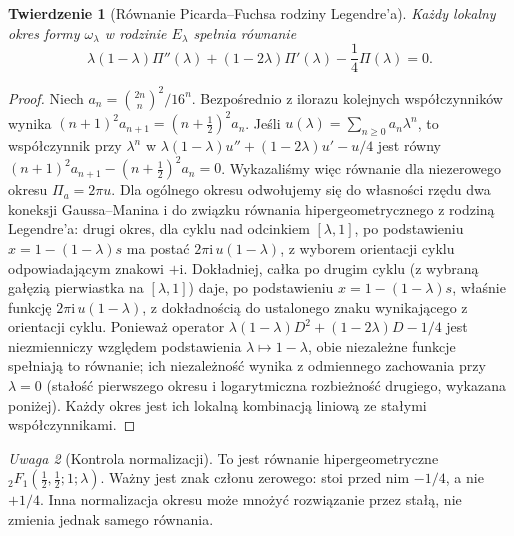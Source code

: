\documentclass[11pt,a4paper,oneside]{report}
\theoremstyle{plain}
\newtheorem{twierdzenie}{Twierdzenie}[section]
\theoremstyle{definition}
\theoremstyle{remark}
\newtheorem{uwaga}[twierdzenie]{Uwaga}
\begin{document}
\begin{twierdzenie}[Równanie Picarda--Fuchsa rodziny Legendre'a]
\label{thm:xv-legendre-pf}
Każdy lokalny okres formy $\omega_\lambda$ w rodzinie
$E_\lambda$ spełnia równanie
\[
\lambda(1-\lambda)\Pi''(\lambda)
+(1-2\lambda)\Pi'(\lambda)
-\frac14\Pi(\lambda)=0.
\]
\end{twierdzenie}
\begin{proof}
Niech $a_n=\binom{2n}{n}^2/16^n$.
Bezpośrednio z ilorazu kolejnych współczynników wynika
$(n+1)^2a_{n+1}=(n+\frac12)^2a_n$.
Jeśli $u(\lambda)=\sum_{n\ge0}a_n\lambda^n$,
to współczynnik przy $\lambda^n$ w
$\lambda(1-\lambda)u''+(1-2\lambda)u'-u/4$
jest równy
$(n+1)^2a_{n+1}-(n+\frac12)^2a_n=0$.
Wykazaliśmy więc równanie dla niezerowego okresu
$\Pi_a=2\pi u$. Dla ogólnego okresu odwołujemy się
do własności rzędu dwa koneksji Gaussa--Manina i
do związku równania hipergeometrycznego z rodziną
Legendre'a: drugi okres, dla cyklu nad odcinkiem $[\lambda,1]$,
po podstawieniu $x=1-(1-\lambda)s$ ma postać
$2\pi\mathrm i\,u(1-\lambda)$, z wyborem orientacji cyklu
odpowiadającym znakowi $+\mathrm i$.
Dokładniej, całka po drugim cyklu (z wybraną gałęzią
pierwiastka na $[\lambda,1]$) daje, po podstawieniu
$x=1-(1-\lambda)s$, właśnie funkcję
$2\pi\mathrm i\,u(1-\lambda)$, z dokładnością do
ustalonego znaku wynikającego z orientacji cyklu.
Ponieważ operator
$\lambda(1-\lambda)D^2+(1-2\lambda)D-1/4$
jest niezmienniczy względem podstawienia
$\lambda\mapsto1-\lambda$, obie niezależne
funkcje spełniają to równanie; ich niezależność
wynika z odmiennego zachowania przy $\lambda=0$
(stałość pierwszego okresu i logarytmiczna
rozbieżność drugiego, wykazana poniżej).
Każdy okres jest ich lokalną kombinacją liniową
ze stałymi współczynnikami.
\end{proof}
\begin{uwaga}[Kontrola normalizacji]
To jest równanie hipergeometryczne
${}_2F_1(\frac12,\frac12;1;\lambda)$.
Ważny jest znak członu zerowego: stoi przed nim
$-1/4$, a nie $+1/4$. Inna normalizacja okresu
może mnożyć rozwiązanie przez stałą, nie zmienia jednak
samego równania.
\end{uwaga}
\end{document}
